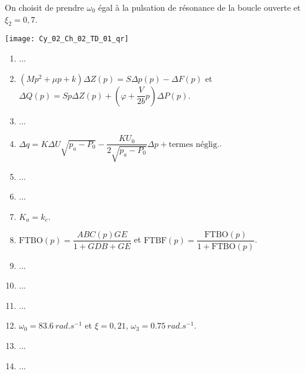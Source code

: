 On choisit de prendre $\omega_0$ égal à la pulsation de résonance de la boucle ouverte et $\xi_2 = 0,7$.


\ifprof
\begin{corrige}
\end{corrige}
\else
\fi


\ifprof
\else
\begin{marginfigure}
\centering
\texttt{[image: Cy\_02\_Ch\_02\_TD\_01\_qr]}
\end{marginfigure}
\fi


\ifcolle
\else
\begin{solution}
\begin{enumerate}
\item ...
\item $\left(Mp^2+\mu p + k \right)\Delta Z(p) = S\Delta p (p)-\Delta F(p)$ et $\Delta Q(p)=S p \Delta Z(p) + \left( \varphi + \dfrac{V}{2b} p \right) \Delta P(p)$.
\item ...
\item $\Delta q = K\Delta U\sqrt{p_a - P_0} - \dfrac{KU_0}{2\sqrt{p_a - P_0}}\Delta p + \text{termes néglig.}$.
\item ...
\item ...
\item $K_a = k_c$.
\item $\text{FTBO}(p)=\dfrac{ABC(p)GE}{1+GDB+GE}$ et $\text{FTBF}(p)=\dfrac{\text{FTBO}(p)}{1+\text{FTBO}(p)}$.
\item ...
\item ...
\item ...
\item $\omega_0=\SI{83,6}{rad.s^{-1}}$ et $\xi=0,21$, $\omega_3 = \SI{0,75}{rad.s^{-1}}$.
\item ...
\item ...
\end{enumerate}
\end{solution}%
\fi

